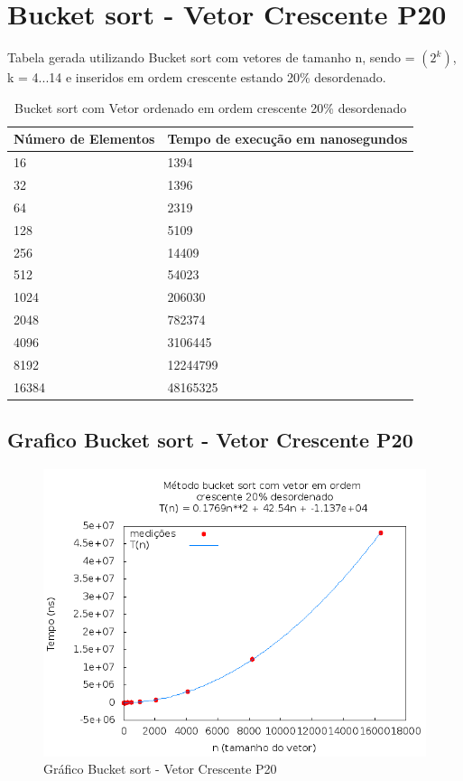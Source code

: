 \documentclass[12pt,a4paper,twoside]{report}
\begin{document}
\section{Bucket sort - Vetor Crescente P20}
Tabela gerada utilizando Bucket sort com vetores de tamanho n, sendo = $(2^k)$, k = 4...14 e inseridos em ordem crescente estando 20\% desordenado.

\begin{table}[H]
\centering
\caption{Bucket sort com Vetor ordenado em ordem crescente 20\% desordenado}
\label{my-label}
\begin{tabular}{|l|l|}
\hline
\multicolumn{1}{|c|}{\textbf{Número de Elementos}} & \multicolumn{1}{c|}{\textbf{Tempo de execução em nanosegundos}} \\ \hline
16 & 1394 \\ \hline
32 & 1396 \\ \hline
64 & 2319 \\ \hline
128 & 5109 \\ \hline
256 & 14409 \\ \hline
512 & 54023 \\ \hline
1024 & 206030 \\ \hline
2048 & 782374 \\ \hline
4096 & 3106445 \\ \hline
8192 & 12244799 \\ \hline
16384 & 48165325 \\ \hline
\end{tabular}
\end{table}

\subsection{Grafico Bucket sort - Vetor Crescente P20}
\begin{figure}[H]
    \centering
    \includegraphics[width=0.7\linewidth]{graficos/Bucket/vIntCrescenteP20/vIntCrescenteP20.png}
  \caption{Gráfico Bucket sort - Vetor Crescente P20}
\end{figure}
\end{document}
